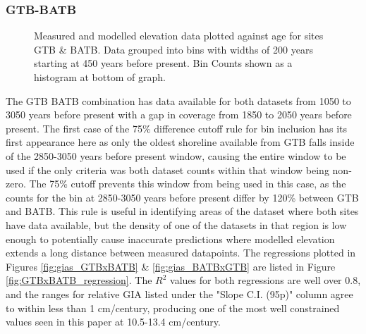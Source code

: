 \subsubsection{GTB-BATB}

\begin{figure}[H]
	\caption{Measured and modelled elevation data plotted against age for sites GTB \& BATB. Data grouped into bins with widths of 200 years starting at 450 years before present. Bin Counts shown as a histogram at bottom of graph.}	
	\label{fig:data_GTBxBATB}
\end{figure}
The GTB BATB combination has data available for both datasets from 1050 to 3050 years before present with 
a gap in coverage from 1850 to 2050 years before present. The first case of the
75\% difference cutoff rule for bin inclusion has its first appearance here as
only the oldest shoreline available from GTB falls inside of the 2850-3050 years
before present window, causing the entire window to be
used if the only criteria was both dataset counts within that window being non-zero.
The 75\% cutoff prevents this window from being used in this case, as the counts
for the bin at 2850-3050 years before present differ by 120\% between GTB and BATB. This rule is useful in identifying
areas of the dataset where both sites have data available, but the density of
one of the datasets in that region is low enough to potentially cause inaccurate
predictions where modelled elevation extends a long distance between measured datapoints.
The regressions plotted in
Figures \ref{fig:gias_GTBxBATB} \& \ref{fig:gias_BATBxGTB} are listed in 
Figure \ref{fig:GTBxBATB_regression}. The $R^2$ values for both regressions
are well over 0.8, and the ranges for relative GIA listed under the "Slope C.I. (95p)" column
agree to within less than 1 cm/century,
producing one of the most well constrained values seen in this paper at 10.5-13.4 cm/century. \\


